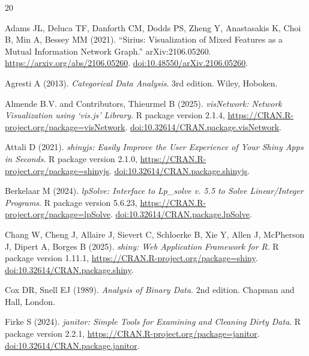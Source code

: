 \documentclass[11pt]{article}
\newcommand{\pkg}[1]{\textsf{#1}}
\newcommand{\proglang}[1]{\textsf{#1}}
\newcommand{\doi}[1]{\href{https://doi.org/#1}{doi:#1}}
\begin{document}
\begin{thebibliography}{20}

Adams JL, Deluca TF, Danforth CM, Dodds PS, Zheng Y, Anastasakis K, Choi B,
Min A, Bessey MM (2021).
\newblock ``Sirius: Visualization of Mixed Features as a Mutual Information
Network Graph.''
\newblock arXiv:2106.05260.
\newblock \url{https://arxiv.org/abs/2106.05260}.
\newblock \doi{10.48550/arXiv.2106.05260}.

Agresti A (2013).
\newblock \emph{Categorical Data Analysis}.
\newblock 3rd edition. Wiley, Hoboken.

Almende B.V. and Contributors, Thieurmel B (2025).
\newblock \emph{\pkg{visNetwork}: Network Visualization using `vis.js' Library}.
\newblock \proglang{R} package version 2.1.4,
\url{https://CRAN.R-project.org/package=visNetwork}.
\newblock \doi{10.32614/CRAN.package.visNetwork}.

Attali D (2021).
\newblock \emph{\pkg{shinyjs}: Easily Improve the User Experience of Your Shiny Apps in Seconds}.
\newblock \proglang{R} package version 2.1.0,
\url{https://CRAN.R-project.org/package=shinyjs}.
\newblock \doi{10.32614/CRAN.package.shinyjs}.

Berkelaar M (2024).
\newblock \emph{\pkg{lpSolve}: Interface to Lp\_solve v. 5.5 to Solve Linear/Integer Programs}.
\newblock \proglang{R} package version 5.6.23,
\url{https://CRAN.R-project.org/package=lpSolve}.
\newblock \doi{10.32614/CRAN.package.lpSolve}.

Chang W, Cheng J, Allaire J, Sievert C, Schloerke B, Xie Y, Allen J,
McPherson J, Dipert A, Borges B (2025).
\newblock \emph{\pkg{shiny}: Web Application Framework for \proglang{R}}.
\newblock \proglang{R} package version 1.11.1,
\url{https://CRAN.R-project.org/package=shiny}.
\newblock \doi{10.32614/CRAN.package.shiny}.

Cox DR, Snell EJ (1989).
\newblock \emph{Analysis of Binary Data}.
\newblock 2nd edition. Chapman and Hall, London.

Firke S (2024).
\newblock \emph{\pkg{janitor}: Simple Tools for Examining and Cleaning Dirty Data}.
\newblock \proglang{R} package version 2.2.1,
\url{https://CRAN.R-project.org/package=janitor}.
\newblock \doi{10.32614/CRAN.package.janitor}.


\end{thebibliography}
\end{document}
